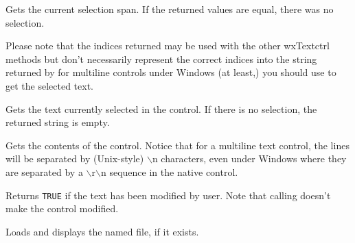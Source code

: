 
Gets the current selection span. If the returned values are equal, there was
no selection.

Please note that the indices returned may be used with the other wxTextctrl
methods but don't necessarily represent the correct indices into the string
returned by  for multiline controls
under Windows (at least,) you should use
 to get the selected
text.






\label{wxtextctrlgetstringselection}


Gets the text currently selected in the control. If there is no selection, the
returned string is empty.

\label{wxtextctrlgetvalue}


Gets the contents of the control. Notice that for a multiline text control,
the lines will be separated by (Unix-style) $\backslash$n characters, even under
Windows where they are separated by a $\backslash$r$\backslash$n sequence in the native control.

\label{wxtextctrlismodified}


Returns {\tt TRUE} if the text has been modified by user. Note that calling 
 doesn't make the control modified.

\label{wxtextctrlloadfile}


Loads and displays the named file, if it exists.

